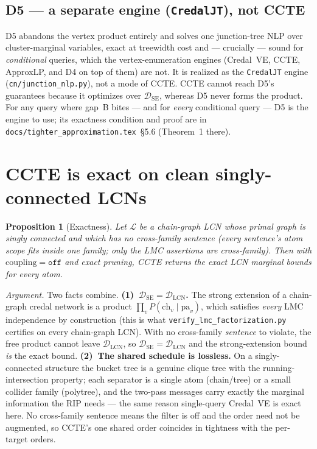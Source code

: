 \documentclass[11pt]{article}
\newtheorem{proposition}{Proposition}
\newcommand{\DSE}{\mathcal{D}_{\mathrm{SE}}}
\newcommand{\DLCN}{\mathcal{D}_{\mathrm{LCN}}}
\begin{document}
\subsection{D5 --- a separate engine (\texttt{CredalJT}), not CCTE}\label{sec:d5}
D5 abandons the vertex product entirely and solves one junction-tree NLP over cluster-marginal
variables, exact at treewidth cost and --- crucially --- sound for \emph{conditional} queries,
which the vertex-enumeration engines (Credal~VE, CCTE, ApproxLP, and D4 on top of them) are
not. It is realized as the \texttt{CredalJT} engine (\texttt{cn/junction\_nlp.py}), not a mode
of CCTE. CCTE cannot reach D5's guarantees because it optimizes over $\DSE$, whereas D5 never
forms the product. For any query where gap~B bites --- and for \emph{every} conditional query ---
D5 is the engine to use; its exactness condition and proof are in
\texttt{docs/tighter\_approximation.tex}~\S5.6 (Theorem~1 there).

\section{CCTE is exact on clean singly-connected LCNs}\label{sec:exact}

\begin{proposition}[Exactness]\label{prop:exact}
Let $\mathcal L$ be a chain-graph LCN whose primal graph is singly connected and which has
\emph{no cross-family sentence} (every sentence's atom scope fits inside one family; only the
LMC assertions are cross-family). Then with $\mathrm{coupling}=\texttt{off}$ and exact pruning,
CCTE returns the exact LCN marginal bounds for every atom.
\end{proposition}

\noindent\emph{Argument.} Two facts combine. \textbf{(1)~$\DSE=\DLCN$.} The strong extension of
a chain-graph credal network is a product $\prod_v P(\mathrm{ch}_v\mid\mathrm{pa}_v)$, which
satisfies \emph{every} LMC independence by construction (this is what
\texttt{verify\_lmc\_factorization.py} certifies on every chain-graph LCN). With no cross-family
\emph{sentence} to violate, the free product cannot leave $\DLCN$, so $\DSE=\DLCN$ and the
strong-extension bound \emph{is} the exact bound. \textbf{(2)~The shared schedule is lossless.}
On a singly-connected structure the bucket tree is a genuine clique tree with the
running-intersection property; each separator is a single atom (chain/tree) or a small collider
family (polytree), and the two-pass messages carry exactly the marginal information the RIP needs
--- the same reason single-query Credal~VE is exact here. No cross-family sentence means the
filter is off and the order need not be augmented, so CCTE's one shared order coincides in
tightness with the per-target orders.
\end{document}
